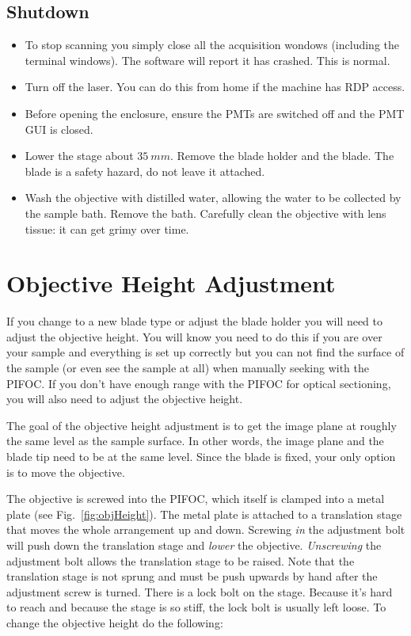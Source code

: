\documentclass[paper=a4, fontsize=11pt]{scrartcl} %
\numberwithin{equation}{section} %
\numberwithin{figure}{section} %
\numberwithin{table}{section} %
\begin{document}
\subsection{Shutdown}
\begin{itemize}

\item To stop scanning you simply close all the acquisition wondows (including the terminal windows).
The software will report it has crashed. This is normal.

\item Turn off the laser. 
You can do this from home if the machine has RDP access.

\item Before opening the enclosure, ensure the PMTs are switched off and the PMT GUI is closed.

\item Lower the stage about $35~mm$. 
Remove the blade holder and the blade. 
The blade is a safety hazard, do not leave it attached.

\item Wash the objective with distilled water, allowing the water to be collected by the sample bath. 
Remove the bath. 
Carefully clean the objective with lens tissue: it can get grimy over time.

\end{itemize}



\section{Objective Height Adjustment}
\label{objheight}
If you change to a new blade type or adjust the blade holder you will need to adjust the objective height. 
You will know you need to do this if you are over your sample and everything is set up correctly but you can not find the surface of the sample (or even see the sample at all) when manually seeking with the PIFOC. 
If you don't have enough range with the PIFOC for optical sectioning, you will also need to adjust the objective height. 

The goal of the objective height adjustment is to get the image plane at roughly the same level as the sample surface. 
In other words, the image plane and the blade tip need to be at the same level. 
Since the blade is fixed, your only option is to move the objective.

The objective is screwed into the PIFOC, which itself is clamped into a metal plate (see Fig.~\ref{fig:objHeight}). 
The metal plate is attached to a translation stage that moves the whole arrangement up and down. 
Screwing \textit{in} the adjustment bolt will push down the translation stage and \textit{lower} the objective. 
\textit{Unscrewing} the adjustment bolt allows the translation stage to be raised. Note that the translation 
stage is not sprung and must be push upwards by hand after the adjustment screw is turned. 
There is a lock bolt on the stage. 
Because it's hard to reach and because the stage is so stiff, the lock bolt is usually left loose. 
To change the objective height do the following:
\end{document}

